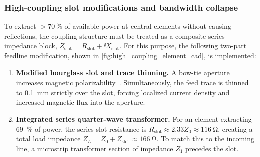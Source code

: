 \subsubsection{High-coupling slot modifications and bandwidth collapse}
\label{sec:high-coupling-elements}

To extract $> \qty{70}{\percent}$ of available power at central elements without causing reflections, the coupling structure must be treated as a composite series impedance block, $Z_{\mathrm{slot}} = R_{\mathrm{slot}} + \ii X_{\mathrm{slot}}$.
For this purpose, the following two-part feedline modification, shown in \cref{fig:high_coupling_element_cad}, is implemented:

\noindent
\begin{minipage}[t]{0.48\linewidth}
    \vspace{0pt}    
    \begin{enumerate}
        \item \textbf{Modified hourglass slot and trace thinning.} A bow-tie aperture increases magnetic polarizability~\parencite{priyalathaCompactModifiedHourglassshaped2023}.
        Simultaneously, the feed trace is thinned to \qty{0.1}{\milli\metre} strictly over the slot, forcing localized current density and increased magnetic flux into the aperture.
        \item \textbf{Integrated series quarter-wave transformer.} For an element extracting \qty{69}{\percent} of power, the series slot resistance is $R_{\mathrm{slot}} \approx 2.33 Z_0 \approx \qty{116}{\ohm}$, creating a total load impedance $Z_L = Z_0 + Z_{\text{slot}} \approx \qty{166}{\ohm}$.
        To match this to the incoming line, a microstrip transformer section of impedance $Z_1$ precedes the slot.
    \end{enumerate}
\end{minipage}%
\hfill
\begin{minipage}[t]{0.48\linewidth}
    \vspace{0pt}
    \centering
    
    \label{fig:high_coupling_element_cad}
\end{minipage}

